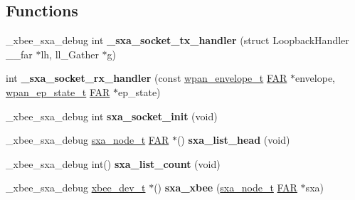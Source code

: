 \subsection*{Functions}
\begin{DoxyCompactItemize}
\item 
\hypertarget{group___s_x_a_ga04cec5760ca52362801366f825805a0f}{\-\_\-xbee\-\_\-sxa\-\_\-debug int {\bfseries \-\_\-sxa\-\_\-socket\-\_\-tx\-\_\-handler} (struct Loopback\-Handler \-\_\-\-\_\-far $\ast$lh, ll\-\_\-\-Gather $\ast$g)}\label{group___s_x_a_ga04cec5760ca52362801366f825805a0f}

\item 
\hypertarget{group___s_x_a_gad08c29c9cffd4775a178909a52d93121}{int {\bfseries \-\_\-sxa\-\_\-socket\-\_\-rx\-\_\-handler} (const \hyperlink{structwpan__envelope__t}{wpan\-\_\-envelope\-\_\-t} \hyperlink{group__hal_gaef060b3456fdcc093a7210a762d5f2ed}{F\-A\-R} $\ast$envelope, \hyperlink{structwpan__ep__state__t}{wpan\-\_\-ep\-\_\-state\-\_\-t} \hyperlink{group__hal_gaef060b3456fdcc093a7210a762d5f2ed}{F\-A\-R} $\ast$ep\-\_\-state)}\label{group___s_x_a_gad08c29c9cffd4775a178909a52d93121}

\item 
\hypertarget{group___s_x_a_gaacbb5ad05beda82f9f21740433c7d3f9}{\-\_\-xbee\-\_\-sxa\-\_\-debug int {\bfseries sxa\-\_\-socket\-\_\-init} (void)}\label{group___s_x_a_gaacbb5ad05beda82f9f21740433c7d3f9}

\item 
\hypertarget{group___s_x_a_gad0139281f543c65392ad240887314fec}{\-\_\-xbee\-\_\-sxa\-\_\-debug \hyperlink{structsxa__node__t}{sxa\-\_\-node\-\_\-t} \hyperlink{group__hal_gaef060b3456fdcc093a7210a762d5f2ed}{F\-A\-R} $\ast$() {\bfseries sxa\-\_\-list\-\_\-head} (void)}\label{group___s_x_a_gad0139281f543c65392ad240887314fec}

\item 
\hypertarget{group___s_x_a_gac6f2b023adc97cc6329c8879ed129520}{\-\_\-xbee\-\_\-sxa\-\_\-debug int() {\bfseries sxa\-\_\-list\-\_\-count} (void)}\label{group___s_x_a_gac6f2b023adc97cc6329c8879ed129520}

\item 
\hypertarget{group___s_x_a_gafcff798c9cdd29339bd32d72fec3ec52}{\-\_\-xbee\-\_\-sxa\-\_\-debug \hyperlink{structxbee__dev__t}{xbee\-\_\-dev\-\_\-t} $\ast$() {\bfseries sxa\-\_\-xbee} (\hyperlink{structsxa__node__t}{sxa\-\_\-node\-\_\-t} \hyperlink{group__hal_gaef060b3456fdcc093a7210a762d5f2ed}{F\-A\-R} $\ast$sxa)}\label{group___s_x_a_gafcff798c9cdd29339bd32d72fec3ec52}


\end{DoxyCompactItemize}

